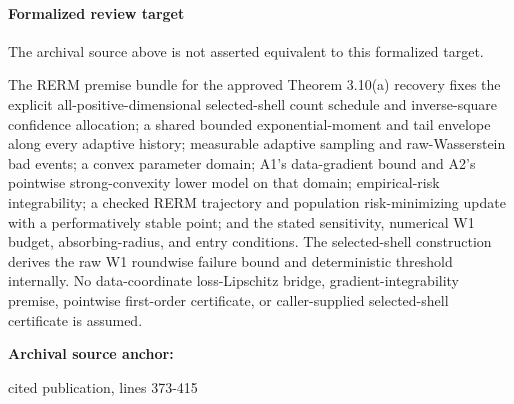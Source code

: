 \documentclass[10pt]{article}
\begin{document}
\paragraph{Formalized review target}
The archival source above is not asserted equivalent to this formalized target.
\begin{ReviewVerbatim}
The RERM premise bundle for the approved Theorem 3.10(a) recovery fixes the explicit all-positive-dimensional selected-shell count schedule and inverse-square confidence allocation; a shared bounded exponential-moment and tail envelope along every adaptive history; measurable adaptive sampling and raw-Wasserstein bad events; a convex parameter domain; A1's data-gradient bound and A2's pointwise strong-convexity lower model on that domain; empirical-risk integrability; a checked RERM trajectory and population risk-minimizing update with a performatively stable point; and the stated sensitivity, numerical W1 budget, absorbing-radius, and entry conditions. The selected-shell construction derives the raw W1 roundwise failure bound and deterministic threshold internally. No data-coordinate loss-Lipschitz bridge, gradient-integrability premise, pointwise first-order certificate, or caller-supplied selected-shell certificate is assumed.
\end{ReviewVerbatim}

\textbf{Archival source anchor:} {\footnotesize\raggedright cited publication, lines 373-\allowbreak{}415\par}
\end{document}
